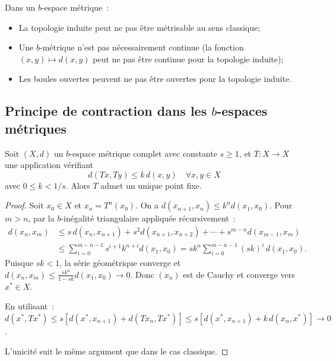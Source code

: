 \begin{attention}[title=\textbf{Difficult\'es sp\'ecifiques aux $b$-m\'etriques}]
Dans un $b$-espace m\'etrique~:
\begin{itemize}
    \item La topologie induite peut ne pas \^etre m\'etrisable au sens classique;
    \item Une $b$-m\'etrique n'est pas n\'ecessairement continue (la fonction
          $(x, y) \mapsto d(x, y)$ peut ne pas \^etre continue pour la topologie
          induite);
    \item Les boules ouvertes peuvent ne pas \^etre ouvertes pour la topologie
          induite.
\end{itemize}
\end{attention}

\subsection{Principe de contraction dans les $b$-espaces m\'etriques}

\begin{theoreme}\label{thm:banach-b}
Soit $(X, d)$ un $b$-espace m\'etrique complet avec constante $s \geq 1$, et
$T : X \to X$ une application v\'erifiant
\[
    d(Tx, Ty) \leq k \, d(x, y) \quad \forall x, y \in X
\]
avec $0 \leq k < 1/s$. Alors $T$ admet un unique point fixe.
\end{theoreme}

\begin{proof}
Soit $x_0 \in X$ et $x_n = T^n(x_0)$. On a $d(x_{n+1}, x_n) \leq k^n d(x_1, x_0)$.
Pour $m > n$, par la $b$-in\'egalit\'e triangulaire appliqu\'ee r\'ecursivement~:
\begin{align*}
    d(x_n, x_m) &\leq s \, d(x_n, x_{n+1}) + s^2 d(x_{n+1}, x_{n+2}) + \cdots + s^{m-n} d(x_{m-1}, x_m) \\
    &\leq \sum_{i=0}^{m-n-1} s^{i+1} k^{n+i} d(x_1, x_0)
    = s k^n \sum_{i=0}^{m-n-1} (sk)^i \, d(x_1, x_0).
\end{align*}
Puisque $sk < 1$, la s\'erie g\'eom\'etrique converge et
$d(x_n, x_m) \leq \frac{sk^n}{1 - sk} d(x_1, x_0) \to 0$.
Donc $(x_n)$ est de Cauchy et converge vers $x^* \in X$.

En utilisant~: $d(x^*, Tx^*) \leq s[d(x^*, x_{n+1}) + d(Tx_n, Tx^*)]
\leq s[d(x^*, x_{n+1}) + k \, d(x_n, x^*)] \to 0$.

L'unicit\'e suit le m\^eme argument que dans le cas classique.
\end{proof}

